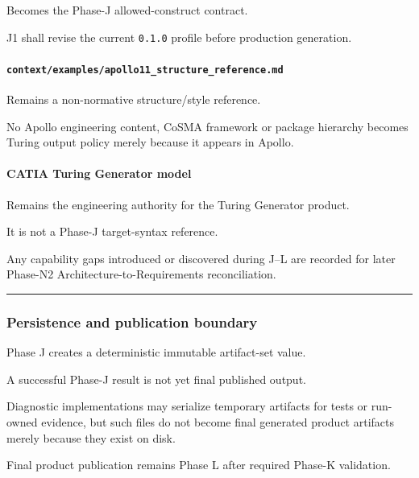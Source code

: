 Becomes the Phase-J allowed-construct contract.

J1 shall revise the current \texttt{0.1.0} profile before production generation.

\hypertarget{contextexamplesapollo11_structure_referencemd}{%
\paragraph{\texorpdfstring{\texttt{context/examples/apollo11\_structure\_reference.md}}{context/examples/apollo11\_structure\_reference.md}}\label{contextexamplesapollo11_structure_referencemd}}

Remains a non-normative structure/style reference.

No Apollo engineering content, CoSMA framework or package hierarchy becomes Turing output policy merely because it appears in Apollo.

\hypertarget{catia-turing-generator-model}{%
\paragraph{CATIA Turing Generator model}\label{catia-turing-generator-model}}

Remains the engineering authority for the Turing Generator product.

It is not a Phase-J target-syntax reference.

Any capability gaps introduced or discovered during J--L are recorded for later Phase-N2 Architecture-to-Requirements reconciliation.

\begin{center}\rule{0.5\linewidth}{0.5pt}\end{center}

\hypertarget{persistence-and-publication-boundary}{%
\subsubsection{Persistence and publication boundary}\label{persistence-and-publication-boundary}}

Phase J creates a deterministic immutable artifact-set value.

A successful Phase-J result is not yet final published output.

Diagnostic implementations may serialize temporary artifacts for tests or run-owned evidence, but such files do not become final generated product artifacts merely because they exist on disk.

Final product publication remains Phase L after required Phase-K validation.


